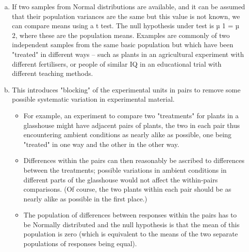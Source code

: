 \documentclass[a4paper,12pt]{article}
\begin{document}
\begin{enumerate}[(a)] 
\item If two samples from Normal distributions are available, and it can be assumed that their population variances are the same but this value is not known, we can compare means using a t test.  The null hypothesis under test is µ 1 = µ 2, where these are the population means. 
 Examples are commonly of two independent samples from the same basic population but which have been "treated" in different ways  –  such as plants in an agricultural experiment with different fertilisers, or people of similar IQ in an educational trial with different teaching methods. 

\item This introduces "blocking" of the experimental units in pairs to remove some possible systematic variation in experimental material. 
\begin{itemize}
    \item  For example, an experiment to compare two "treatments" for plants in a glasshouse might have adjacent pairs of plants, the two in each pair thus encountering ambient conditions as nearly alike as possible, one being "treated" in one way and the other in the other way.  
    \item Differences within the pairs can then reasonably be ascribed to differences between the treatments;  possible variations in ambient conditions in different parts of the glasshouse would not affect the within-pairs comparisons.  (Of course, the two plants within each pair should be as nearly alike as possible in the first place.)  
    \item The population of differences between responses within the pairs has to be Normally distributed and the null hypothesis is that the mean of this population is zero (which is equivalent to the means of the two separate populations of responses being equal). 
\end{itemize}


\end{enumerate}
\end{document}

